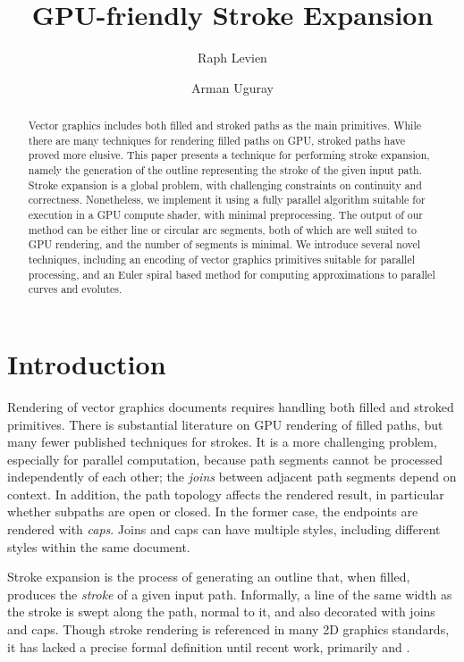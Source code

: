 \documentclass[sigconf, authordraft]{acmart}
\begin{document}
\title{GPU-friendly Stroke Expansion}
\author{Raph Levien}
\author{Arman Uguray}

\begin{abstract}
    Vector graphics includes both filled and stroked paths as the main primitives. While there are many techniques for rendering filled paths on GPU, stroked paths have proved more elusive. This paper presents a technique for performing stroke expansion, namely the generation of the outline representing the stroke of the given input path. Stroke expansion is a global problem, with challenging constraints on continuity and correctness. Nonetheless, we implement it using a fully parallel algorithm suitable for execution in a GPU compute shader, with minimal preprocessing. The output of our method can be either line or circular arc segments, both of which are well suited to GPU rendering, and the number of segments is minimal. We introduce several novel techniques, including an encoding of vector graphics primitives suitable for parallel processing, and an Euler spiral based method for computing approximations to parallel curves and evolutes.
\end{abstract}

\maketitle
\thispagestyle{empty}
\pagestyle{plain}

\section{Introduction}

Rendering of vector graphics documents requires handling both filled and stroked primitives. There is substantial literature on GPU rendering of filled paths, but many fewer published techniques for strokes. It is a more challenging problem, especially for parallel computation, because path segments cannot be processed independently of each other; the \emph{joins} between adjacent path segments depend on context. In addition, the path topology affects the rendered result, in particular whether subpaths are open or closed. In the former case, the endpoints are rendered with \emph{caps}. Joins and caps can have multiple styles, including different styles within the same document.

Stroke expansion is the process of generating an outline that, when filled, produces the \emph{stroke} of a given input path. Informally, a line of the same width as the stroke is swept along the path, normal to it, and also decorated with joins and caps. Though stroke rendering is referenced in many 2D graphics standards, it has lacked a precise formal definition until recent work, primarily \cite{Nehab2020} and \cite{Kilgard2020}.
\end{document}
